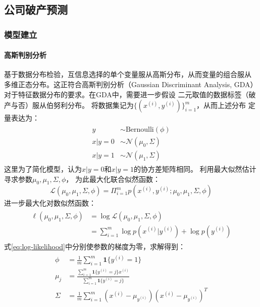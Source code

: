 \subsection{公司破产预测}
\subsubsection{模型建立}
\paragraph{高斯判别分析}
基于数据分布检验，互信息选择的单个变量服从高斯分布，从而变量的组合服从
多维正态分布。这正符合高斯判别分析（Gaussian Discriminant Analysis, GDA）
对于特征数据分布的要求。在GDA中，需要进一步假设
二元取值的数据标签（破产与否）服从伯努利分布。
将数据集记为$\{(x^{(i)}, y^{(i)})\}_{i=1}^m$，从而上述分布
定量表达为：
\begin{align}
    \begin{split}
    y &\sim \text{Bernoulli} (\phi) \\
    x|y = 0 &\sim \mathcal{N}(\mu_0, \Sigma) \\
    x|y = 1 &\sim \mathcal{N}(\mu_1, \Sigma)
    \end{split}
    \label{eq:assumptions-mul-gaussian}
\end{align}
这里为了简化模型，认为$x|y = 0$和$x|y = 1$的协方差矩阵相同。
利用最大似然估计寻求参数$\mu_0, \mu_1, \Sigma, \phi$，
为此最大化联合似然函数：
\begin{equation*}
    \mathcal{L}(\mu_0, \mu_1, \Sigma, \phi)=\Pi_{i=1}^{m}
p(x^{(i)}, y^{(i)}; \mu_0, \mu_1, \Sigma, \phi)
\end{equation*}
进一步最大化对数似然函数：
\begin{align}
\begin{split}
    \ell (\mu_0, \mu_1, \Sigma, \phi) &=\log \mathcal{L}(\mu_0, \mu_1, \Sigma, \phi) \\
    &=\sum\limits_{i=1}^{m} \log p(x^{(i)} | y^{(i)}) + \log p(y^{(i)})
\end{split}
    \label{eq:log-likelihood}
\end{align}
式\ref{eq:log-likelihood}中分别使参数的梯度为零，求解得到：
\begin{align}
    \begin{split}
    \phi &= \frac{1}{m}\sum\limits_{i=1}^{m} \mathbf{1}\{y^{(i)}=1\} \\
    \mu_j &= \frac{\sum_{i=1}^{m}\mathbf{1}\{y^{(i)}=j\}x^{(i)}}{
        \sum_{i=1}^{m}\mathbf{1}\{y^{(i)}=j\}
    } \\
    \Sigma &= \frac{1}{m}\sum\limits_{i=1}^{m}(x^{(i)}-\mu_{y^{(i)}})
    (x^{(i)}-\mu_{y^{(i)}})^T
    \end{split}
    \label{eq:MLE-GDA}
\end{align}

